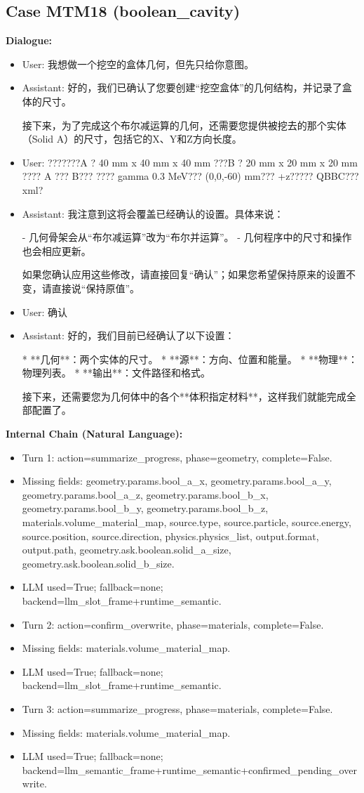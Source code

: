 \documentclass[11pt]{ctexart}
\begin{document}
\subsection{Case MTM18 (boolean\_cavity)}
\textbf{Dialogue:}
\begin{itemize}
\item User: 我想做一个挖空的盒体几何，但先只给你意图。
\item Assistant: 好的，我们已确认了您要创建“挖空盒体”的几何结构，并记录了盒体的尺寸。

接下来，为了完成这个布尔减运算的几何，还需要您提供被挖去的那个实体（Solid A）的尺寸，包括它的X、Y和Z方向长度。
\item User: ???????A ? 40 mm x 40 mm x 40 mm ???B ? 20 mm x 20 mm x 20 mm ???? A ??? B??? ???? gamma 0.3 MeV??? (0,0,-60) mm??? +z????? QBBC??? xml?
\item Assistant: 我注意到这将会覆盖已经确认的设置。具体来说：

- 几何骨架会从“布尔减运算”改为“布尔并运算”。
- 几何程序中的尺寸和操作也会相应更新。

如果您确认应用这些修改，请直接回复“确认”；如果您希望保持原来的设置不变，请直接说“保持原值”。
\item User: 确认
\item Assistant: 好的，我们目前已经确认了以下设置：

*   **几何**：两个实体的尺寸。
*   **源**：方向、位置和能量。
*   **物理**：物理列表。
*   **输出**：文件路径和格式。

接下来，还需要您为几何体中的各个**体积指定材料**，这样我们就能完成全部配置了。
\end{itemize}
\textbf{Internal Chain (Natural Language):}
\begin{itemize}
\item Turn 1: action=summarize\_progress, phase=geometry, complete=False.
\item Missing fields: geometry.params.bool\_a\_x, geometry.params.bool\_a\_y, geometry.params.bool\_a\_z, geometry.params.bool\_b\_x, geometry.params.bool\_b\_y, geometry.params.bool\_b\_z, materials.volume\_material\_map, source.type, source.particle, source.energy, source.position, source.direction, physics.physics\_list, output.format, output.path, geometry.ask.boolean.solid\_a\_size, geometry.ask.boolean.solid\_b\_size.
\item LLM used=True; fallback=none; backend=llm\_slot\_frame+runtime\_semantic.
\item Turn 2: action=confirm\_overwrite, phase=materials, complete=False.
\item Missing fields: materials.volume\_material\_map.
\item LLM used=True; fallback=none; backend=llm\_slot\_frame+runtime\_semantic.
\item Turn 3: action=summarize\_progress, phase=materials, complete=False.
\item Missing fields: materials.volume\_material\_map.
\item LLM used=True; fallback=none; backend=llm\_semantic\_frame+runtime\_semantic+confirmed\_pending\_overwrite.
\end{itemize}
\end{document}
